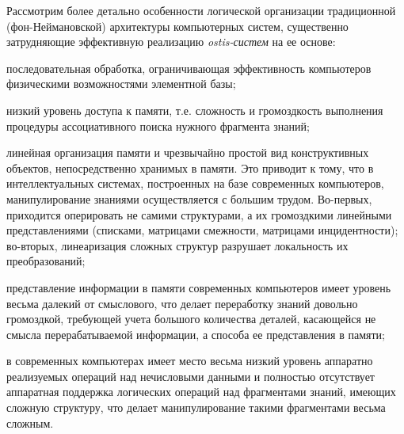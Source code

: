 Рассмотрим более детально особенности логической организации традиционной (фон-Неймановской) архитектуры компьютерных систем, существенно затрудняющие эффективную реализацию \textit{ostis-систем} на ее основе:
\begin{textitemize}
	\item последовательная обработка, ограничивающая эффективность компьютеров физическими возможностями элементной базы;
	\item низкий уровень доступа к памяти, т.е. сложность и громоздкость выполнения процедуры ассоциативного поиска нужного фрагмента знаний; 
	\item линейная организация памяти и чрезвычайно простой вид конструктивных объектов, непосредственно хранимых в памяти. Это приводит к тому, что в интеллектуальных системах, построенных на базе современных компьютеров, манипулирование знаниями осуществляется с большим трудом. Во-первых, приходится оперировать не самими структурами, а их громоздкими линейными представлениями (списками, матрицами смежности, матрицами инцидентности); во-вторых, линеаризация сложных структур разрушает локальность их преобразований;
	\item представление информации в памяти современных компьютеров имеет уровень весьма далекий от смыслового, что делает переработку знаний довольно громоздкой, требующей учета большого количества деталей, касающейся не смысла перерабатываемой информации, а способа ее представления в памяти;
	\item в современных компьютерах имеет место весьма низкий уровень аппаратно реализуемых операций над нечисловыми данными и полностью отсутствует аппаратная поддержка логических операций над фрагментами знаний, имеющих сложную структуру, что делает манипулирование такими фрагментами весьма сложным.
\end{textitemize}

